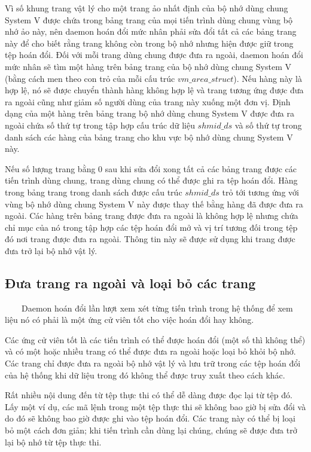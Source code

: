 \documentclass{article}
\begin{document}
Vì số khung trang vật lý cho một trang ảo nhất định của bộ nhớ dùng chung System V được chứa trong bảng trang của mọi tiến trình dùng chung vùng bộ nhớ ảo này, nên daemon hoán đổi mức nhân phải sửa đổi tất cả các bảng trang này để cho biết rằng trang không còn trong bộ nhớ nhưng hiện được giữ trong tệp hoán đổi. Đối với mỗi trang dùng chung được đưa ra ngoài, daemon hoán đổi mức nhân sẽ tìm một hàng trên bảng trang của bộ nhớ dùng chung System V (bằng cách men theo con trỏ của mỗi cấu trúc $vm\_area\_struct$). Nếu hàng này là hợp lệ, nó sẽ được chuyển thành hàng không hợp lệ và trang tương ứng được đưa ra ngoài cũng như giảm số người dùng của trang này xuống một đơn vị. Định dạng của một hàng trên bảng trang bộ nhớ dùng chung System V được đưa ra ngoài chứa số thứ tự trong tập hợp cấu trúc dữ liệu $shmid\_ds$ và số thứ tự trong danh sách các hàng của bảng trang cho khu vực bộ nhớ dùng chung System V này.\vspace{1em}

Nếu số lượng trang bằng 0 sau khi sửa đổi xong tất cả các bảng trang được các tiến trình dùng chung, trang dùng chung có thể được ghi ra tệp hoán đổi. Hàng trong bảng trang trong danh sách được cấu trúc $shmid\_ds$ trỏ tới tương ứng với vùng bộ nhớ dùng chung System V này được thay thế bằng hàng đã được đưa ra ngoài. Các hàng trên bảng trang được đưa ra ngoài là không hợp lệ nhưng chứa chỉ mục của nó trong tập hợp các tệp hoán đổi mở và vị trí tương đối trong tệp đó nơi trang được đưa ra ngoài. Thông tin này sẽ được sử dụng khi trang được đưa trở lại bộ nhớ vật lý.

\subsection{Đưa trang ra ngoài và loại bỏ các trang}

~~~~Daemon hoán đổi lần lượt xem xét từng tiến trình trong hệ thống để xem liệu nó có phải là một ứng cử viên tốt cho việc hoán đổi hay không.\vspace{1em}

Các ứng cử viên tốt là các tiến trình có thể được hoán đổi (một số thì không thể) và có một hoặc nhiều trang có thể được đưa ra ngoài hoặc loại bỏ khỏi bộ nhớ. Các trang chỉ được đưa ra ngoài bộ nhớ vật lý và lưu trữ trong các tệp hoán đổi của hệ thống khi dữ liệu trong đó không thể được truy xuất theo cách khác.\vspace{1em}

Rất nhiều nội dung đến từ tệp thực thi có thể dễ dàng được đọc lại từ tệp đó. Lấy một ví dụ, các mã lệnh trong một tệp thực thi sẽ không bao giờ bị sửa đổi và do đó sẽ không bao giờ được ghi vào tệp hoán đổi. Các trang này có thể bị loại bỏ một cách đơn giản; khi tiến trình cần dùng lại chúng, chúng sẽ được đưa trở lại bộ nhớ từ tệp thực thi.\vspace{1em}
\end{document}
